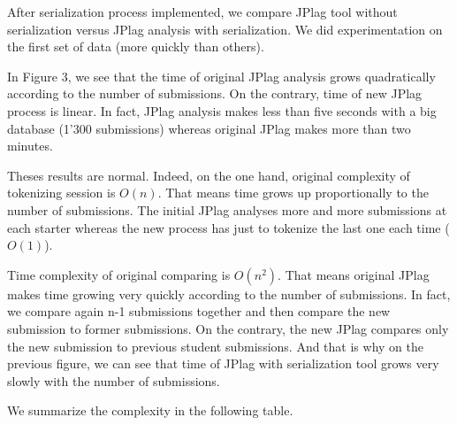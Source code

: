\documentclass[twoside]{article}
\newenvironment{Figure}
  {\par\medskip\noindent\minipage{\linewidth}}
  {\endminipage\par\medskip}
\begin{document}
\begin{multicols*}{2}
After serialization process implemented, we compare JPlag tool without serialization versus JPlag analysis with serialization. We did experimentation on the first set of data (more quickly than others).

\begin{Figure}
 	\centering
\end{Figure}

In Figure 3, we see that the time of original JPlag analysis grows quadratically according to the number of submissions. On the contrary, time of new JPlag process is linear. In fact, JPlag analysis makes less than five seconds with a big database (1'300 submissions) whereas original JPlag makes more than two minutes. 

Theses results are normal. Indeed, on the one hand, original complexity of tokenizing session is $O(n)$. That means time grows up proportionally to the number of submissions. The initial JPlag analyses more and more submissions at each starter whereas the new process has just to tokenize the last one each time ($O(1)$).

Time complexity of original comparing is $O(n^2)$. That means original JPlag makes time growing very quickly according to the number of submissions. In fact, we compare again n-1 submissions together and then compare the new submission to former submissions. On the contrary, the new JPlag compares only the new submission to previous student submissions. And that is why on the previous figure, we can see that time of JPlag with serialization tool grows very slowly with the number of submissions. 

\newpage
We summarize the complexity in the following table.


\end{multicols*}
\end{document}
